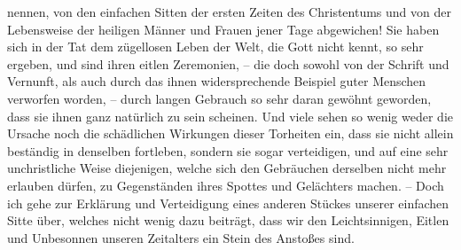 nennen, von den einfachen Sitten der ersten Zeiten des Christentums und von
der Lebensweise der heiligen Männer und Frauen jener Tage abgewichen! Sie haben
sich in der Tat dem zügellosen Leben der Welt, die Gott nicht kennt, so sehr
ergeben, und sind ihren eitlen Zeremonien, -- die doch sowohl von der Schrift
und Vernunft, als auch durch das ihnen widersprechende Beispiel guter Menschen
verworfen worden, -- durch langen Gebrauch so sehr daran gewöhnt geworden, dass
sie
ihnen ganz natürlich zu sein scheinen. Und viele sehen so wenig weder die
Ursache noch die schädlichen Wirkungen dieser Torheiten ein, dass sie nicht
allein beständig in denselben fortleben, sondern sie sogar verteidigen,
und auf eine sehr unchristliche Weise diejenigen, welche sich den Gebräuchen
derselben nicht mehr erlauben dürfen, zu Gegenständen ihres Spottes und
Gelächters machen. -- Doch ich gehe zur Erklärung und Verteidigung eines anderen
Stückes unserer einfachen Sitte über, welches nicht wenig dazu beiträgt, dass
wir
den Leichtsinnigen, Eitlen und Unbesonnen unseren Zeitalters ein Stein des
Anstoßes sind.




